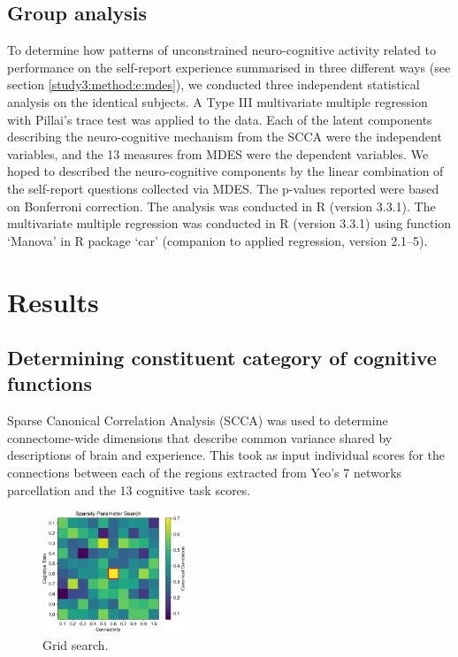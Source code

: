 \subsection{Group analysis}
\label{study3:method:g}

To determine how patterns of unconstrained neuro-cognitive activity related to performance on the self-report experience summarised in three different ways (see section \ref{study3:method:e:mdes}), 
we conducted three independent statistical analysis on the identical subjects. A Type III multivariate multiple regression with Pillai's trace test was applied to the data. Each of the latent components describing the neuro-cognitive mechanism from the SCCA were the independent variables, and the 13 measures from MDES were the dependent variables. We hoped to described the neuro-cognitive components by the linear combination of the self-report questions collected via MDES. The p-values reported were based on Bonferroni correction. The analysis was conducted in R (version 3.3.1). The multivariate multiple regression was conducted in R (version 3.3.1) using function ‘Manova’ in R package ‘car’ (companion to applied regression, version 2.1–5).

\section{Results}
\label{study3:results}

\subsection{Determining constituent category of cognitive functions}

Sparse Canonical Correlation Analysis (SCCA) was used to determine connectome-wide dimensions that describe common variance shared by descriptions of brain and experience. This took as input individual scores for the connections between each of the regions extracted from Yeo’s 7 networks parcellation and the 13 cognitive task scores.

\begin{figure}    
    \vspace{-10pt}
    \centering
    \includegraphics[width=0.38\textwidth]{chapters/img/study3fig2.png}
	\caption{Grid search.} 
	\label{fig:study3:fig2}
	\vspace{-20pt}
\end{figure}

